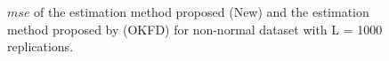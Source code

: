 \documentclass[]{interact}
\theoremstyle{plain}%
\theoremstyle{definition}
\theoremstyle{remark}
\begin{document}
\begin{figure}[htbp]
  \caption{$mse$ of the estimation method proposed (New) and the estimation method proposed by \cite{giraldo2011ordinary} (OKFD) for non-normal dataset with L = 1000 replications.}
\end{figure}
\end{document}
